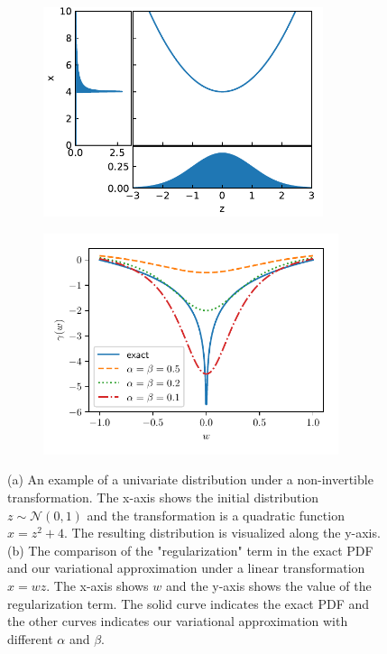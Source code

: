 \documentclass[twoside]{article}
\begin{document}
\begin{figure}
     \begin{subfigure}[t]{0.45\textwidth}
         \centering
         \includegraphics[width=0.9\textwidth]{non-invertible_1d.pdf} 
         \caption{}
         \label{fig:nfw_1d_example}
     \end{subfigure}
     \begin{subfigure}[t]{0.45\textwidth}
         \centering
         \includegraphics[width=0.95\textwidth]{regulerizer.pdf} 
         \caption{}
         \label{fig:regularization}
     \end{subfigure}
\caption{(a) An example of a univariate distribution under a non-invertible transformation. The x-axis shows the initial distribution $z \sim \mathcal{N}(0, 1)$ and the transformation is a quadratic function $x=z^2+4$. The resulting distribution is visualized along the y-axis. (b) The comparison of the "regularization" term in the exact PDF and our variational approximation under a linear transformation $x=wz$. The x-axis shows $w$ and the y-axis shows the value of the regularization term.  The solid curve indicates the exact PDF and the other curves indicates our variational approximation with different $\alpha$ and $\beta$.} 
\end{figure}
\end{document}
